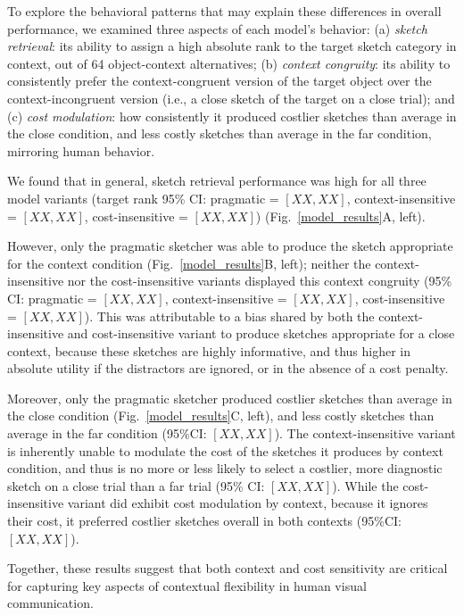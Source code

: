 \documentclass[9pt,twocolumn,twoside]{pnas-new}
\begin{document}
To explore the behavioral patterns that may explain these differences in overall performance, we examined three aspects of each model's behavior: (a) \textit{sketch retrieval}: its ability to assign a high absolute rank to the target sketch category in context, out of 64 object-context alternatives; (b) \textit{context congruity}: its ability to consistently prefer the context-congruent version of the target object over the context-incongruent version (i.e., a close sketch of the target on a close trial); and (c) \textit{cost modulation}: how consistently it produced costlier sketches than average in the close condition, and less costly sketches than average in the far condition, mirroring human behavior.

We found that in general, sketch retrieval performance was high for all three model variants (target rank 95\% CI: pragmatic = $[XX,XX]$, context-insensitive = $[XX,XX]$, cost-insensitive = $[XX,XX]$) (Fig.~\ref{model_results}A, left).

However, only the pragmatic sketcher was able to produce the sketch appropriate for the context condition (Fig.~\ref{model_results}B, left); neither the context-insensitive nor the cost-insensitive variants displayed this context congruity (95\% CI: pragmatic = $[XX,XX]$, context-insensitive = $[XX,XX]$, cost-insensitive = $[XX,XX]$). 
This was attributable to a bias shared by both the context-insensitive and cost-insensitive variant to produce sketches appropriate for a close context, because these sketches are highly informative, and thus higher in absolute utility if the distractors are ignored, or in the absence of a cost penalty. 

Moreover, only the pragmatic sketcher produced costlier sketches than average in the close condition (Fig.~\ref{model_results}C, left), and less costly sketches than average in the far condition (95\%CI: $[XX,XX]$). The context-insensitive variant is inherently unable to modulate the cost of the sketches it produces by context condition, and thus is no more or less likely to select a costlier, more diagnostic sketch on a close trial than a far trial (95\% CI: $[XX,XX]$). 
While the cost-insensitive variant did exhibit cost modulation by context, because it ignores their cost, it preferred costlier sketches overall in both contexts (95\%CI: $[XX,XX]$). 

Together, these results suggest that both context and cost sensitivity are critical for capturing key aspects of contextual flexibility in human visual communication. 
\end{document}
